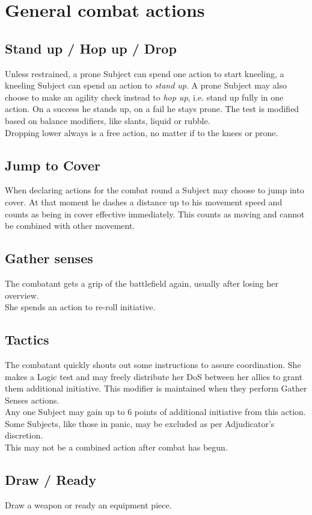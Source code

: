 \section{General combat actions}
\subsection*{Stand up / Hop up / Drop}
Unless restrained, a prone Subject can spend one action to start kneeling,
	a kneeling Subject can spend an action to \emph{stand up}.
A prone Subject may also choose to make an agility check instead to \emph{hop up},
	i.e. stand up fully in one action.
On a success he stands up, on a fail he stays prone.
The test is modified based on balance modifiers, like slants, liquid or rubble.
\\%
Dropping lower always is a free action, no matter if to the knees or prone.
\subsection*{Jump to Cover}
When declaring actions for the combat round a Subject may choose to jump into cover.
At that moment he dashes a distance up to his movement speed
	and counts as being in cover effective immediately.
This counts as moving and cannot be combined with other movement.
\subsection*{Gather senses}
The combatant gets a grip of the battlefield again, usually after losing her overview.
\\%
She spends an action to re-roll initiative.
\subsection*{Tactics}
The combatant quickly shouts out some instructions to assure coordination.
She makes a Logic test and may freely distribute her DoS between her allies to grant them additional initiative.
This modifier is maintained when they perform Gather Senses actions.\\
Any one Subject may gain up to 6 points of additional initiative from this action.
Some Subjects, like those in panic, may be excluded as per Adjudicator's discretion.
\\%
This may not be a combined action after combat has begun.
\subsection*{Draw / Ready}
Draw a weapon or ready an equipment piece.
